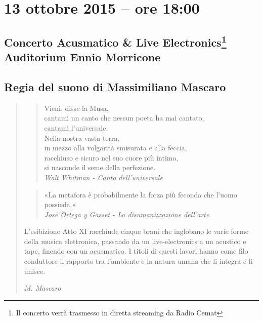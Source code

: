 \documentclass[8pt, twoside, a5paper]{extreport}
\begin{document}
\bigskip

\begin{multicols}{2}




\end{multicols}

\clearpage

\section*{13 ottobre 2015 -- ore 18:00}

\subsection*{{\small Concerto Acusmatico \& Live Electronics\footnote{ Il concerto verrà trasmesso in diretta streaming da Radio Cemat}} \\
	\textsf{Auditorium Ennio Morricone}}

{\fontsize{30}{30} }

\subsection*{\textsf{Regia del suono di Massimiliano Mascaro}}

\begin{quote}

{\svolk \small
\begin{quote}Vieni, disse la Musa,\\
cantami un canto che nessun poeta ha mai cantato,\\
cantami l'universale.\\
Nella nostra vasta terra,\\
in mezzo alla volgarità smisurata e alla feccia,\\
racchiuso e sicuro nel suo cuore più intimo,\\
si nasconde il seme della perfezione.\\
\hspace{1mm}\emph{Walt Whitman - Canto dell'universale}
\end{quote}

\begin{quote}«La metafora è probabilmente la forza più feconda che l'uomo possieda.»\\
\hspace{1mm}\emph{Jos\'e Ortega y  Gasset - La disumanizzazione dell'arte}
\end{quote}

L'esibizione Atto XI racchiude cinque brani che inglobano le varie forme della musica elettronica, passando da un live-electronics a un acustico e tape, finendo con un acusmatico. I titoli di questi lavori hanno come filo conduttore il rapporto tra l'ambiente e la natura umana che li integra e li unisce.}

\emph{M. Mascaro}
\end{quote}    
\end{document}
